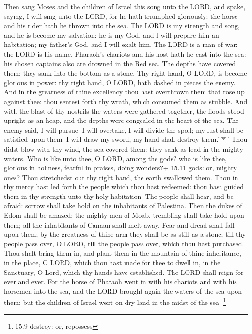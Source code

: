  Then sang Moses and the children of Israel this song unto
the LORD, and spake, saying, I will sing unto the LORD, for he hath
triumphed gloriously: the horse and his rider hath he thrown into the
sea.  The LORD is my strength and song, and he is become my
salvation: he is my God, and I will prepare him an habitation; my
father's God, and I will exalt him.  The LORD is a man of
war: the LORD is his name.  Pharaoh's chariots and his host
hath he cast into the sea: his chosen captains also are drowned in the
Red sea.  The depths have covered them: they sank into the
bottom as a stone.  Thy right hand, O LORD, is become
glorious in power: thy right hand, O LORD, hath dashed in pieces the
enemy.  And in the greatness of thine excellency thou hast
overthrown them that rose up against thee: thou sentest forth thy wrath,
which consumed them as stubble.  And with the blast of thy
nostrils the waters were gathered together, the floods stood upright as
an heap, and the depths were congealed in the heart of the sea.
 The enemy said, I will pursue, I will overtake, I will
divide the spoil; my lust shall be satisfied upon them; I will draw my
sword, my hand shall destroy them.\^{}*\^{}  Thou didst
blow with thy wind, the sea covered them: they sank as lead in the
mighty waters.  Who is like unto thee, O LORD, among the
gods? who is like thee, glorious in holiness, fearful in praises, doing
wonders?+ 15.11 gods: or, mighty ones?  Thou stretchedst
out thy right hand, the earth swallowed them.  Thou in thy
mercy hast led forth the people which thou hast redeemed: thou hast
guided them in thy strength unto thy holy habitation.  The
people shall hear, and be afraid: sorrow shall take hold on the
inhabitants of Palestina.  Then the dukes of Edom shall be
amazed; the mighty men of Moab, trembling shall take hold upon them; all
the inhabitants of Canaan shall melt away.  Fear and dread
shall fall upon them; by the greatness of thine arm they shall be as
still as a stone; till thy people pass over, O LORD, till the people
pass over, which thou hast purchased.  Thou shalt bring
them in, and plant them in the mountain of thine inheritance, in the
place, O LORD, which thou hast made for thee to dwell in, in the
Sanctuary, O Lord, which thy hands have established.  The
LORD shall reign for ever and ever.  For the horse of
Pharaoh went in with his chariots and with his horsemen into the sea,
and the LORD brought again the waters of the sea upon them; but the
children of Israel went on dry land in the midst of the sea. \footnote{15.9
  destroy: or, repossess}

